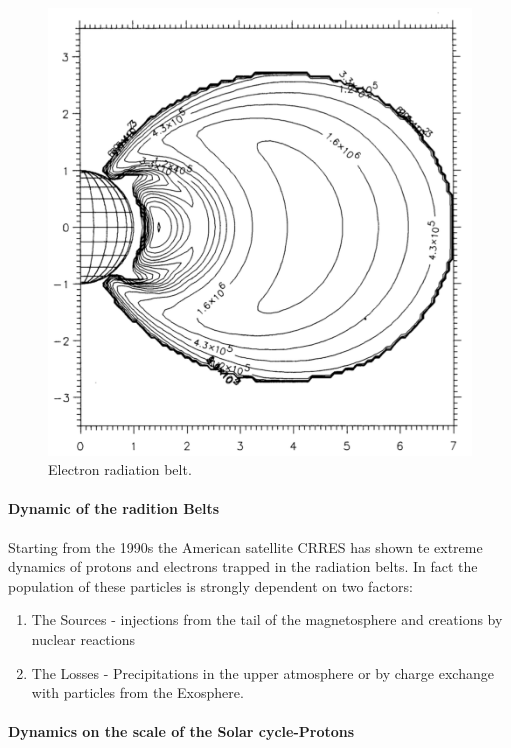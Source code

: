 \documentclass[./dissertation.tex]{subfiles}
\begin{document}
\begin{figure}[h!]
\centering
  \includegraphics[scale = 0.50]{imgs/radbelt4.png}
  \caption{Electron radiation belt. \cite{bib2}}
  \label{fig:radbel4}
\end{figure}
%
\paragraph{Dynamic of the radition Belts}

Starting from the 1990s the American satellite CRRES has shown te extreme dynamics of protons and electrons trapped in the radiation belts. In fact the population of these particles is strongly dependent on two factors:
\begin{enumerate}
    \item The Sources - injections from the tail of the magnetosphere and creations by nuclear reactions
    \item The Losses - Precipitations in the upper atmosphere or by charge exchange with particles from the Exosphere. 
\end{enumerate}

\paragraph{Dynamics on the scale of the Solar cycle-Protons}
\end{document}
